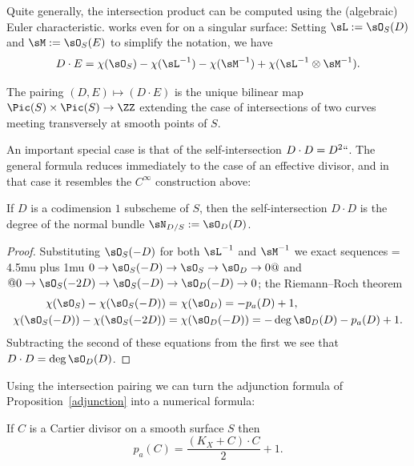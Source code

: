 Quite generally, 
the intersection product can be computed using the (algebraic) Euler
characteristic. 
works even for 
on a singular surface: Setting $\sL := \sO_S(D)$ and
%
%
$\sM := \sO_S(E)$ to simplify the notation, we have 
$$
D\cdot E = \chi(\sO_S)-\chi(\sL^{-1}) -\chi(\sM^{-1}) +\chi(\sL^{-1}\otimes \sM^{-1}) 
.
$$

\begin{theorem} The pairing $(D,E) \mapsto (D\cdot E)$ is the unique bilinear map
$\Pic(S) \times \Pic(S) \to \ZZ$ extending the case of intersections of two curves meeting transversely at smooth points of $S$. 
\end{theorem}

An important special case is that of the self-intersection $D\cdot D = D^2` `$. The general formula reduces immediately to the case of an effective divisor, and in that case it resembles the $C^{\infty}$ construction above:

\begin{corollary}\label{self-intersection number}
If $D$ is a codimension $1$ subscheme of $S$, then the self-intersection $D\cdot D$ is the degree of the normal bundle
$\sN_{D/S} := \sO_{D}(D)$.
\end{corollary}

\begin{proof}
Substituting $\sO_{S}(-D)$ for both $\sL^{-1}$ and $\sM^{-1}$ we
exact sequences
\begingroup
\thickmuskip = 4.5mu plus 1mu 
$ 0\to \sO_{S}(-D)\to \sO_{S}\to \sO_{D}\to 0@$ and 
$@0\to \sO_{S}(-2D)\to \sO_{S}(-D)\to \sO_{D}(-D)\to 0$;
the Riemann--Roch theorem 
\endgroup
{}
\begin{align*}
\chi(\sO_{S}) -\chi(\sO_{S}(-D)) &= \chi(\sO_{D}) = -p_{a}(D) +1,\\
\chi(\sO_{S}(-D)) -\chi(\sO_{S}(-2D)) &= \chi(\sO_{D}(-D)) = -\deg \sO_{D}(D) - p_{a}(D) +1.
\end{align*}
Subtracting the second of these equations from the first we see that
$D\cdot D = \deg \sO_{D}(D)$.
\end{proof}

Using the intersection pairing we can turn the adjunction formula of Proposition~\ref{adjunction} into a numerical formula:

\begin{theorem}\label{adjunction formula} 
If $C$ is a Cartier divisor on a smooth surface $S$ then
%
$$
p_a(C) = \frac{(K_X+C)\cdot C}{2} +1.
 $$
\end{theorem}

